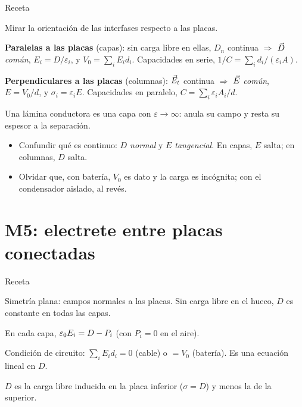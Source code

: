 \begin{metodo}{Receta}
\begin{pasos}
  \item Mirar la orientación de las interfases respecto a las placas.
  \item \textbf{Paralelas a las placas} (capas): sin carga libre en ellas, $D_n$ continua $\Rightarrow$ $\vec D$ \emph{común}, $E_i=D/\varepsilon_i$,
        y $V_0=\sum_iE_id_i$. Capacidades en serie, $1/C=\sum_i d_i/(\varepsilon_iA)$.
  \item \textbf{Perpendiculares a las placas} (columnas): $\vec E_t$ continua $\Rightarrow$ $\vec E$ \emph{común}, $E=V_0/d$, y $\sigma_i=\varepsilon_iE$.
        Capacidades en paralelo, $C=\sum_i\varepsilon_iA_i/d$.
  \item Una lámina conductora es una capa con $\varepsilon\to\infty$: anula su campo y resta su espesor a la separación.
\end{pasos}
\end{metodo}

\begin{trampa}
\begin{itemize}
  \item Confundir qué es continuo: \emph{$D$ normal} y \emph{$E$ tangencial}. En capas, $E$ salta; en columnas, $D$ salta.
  \item Olvidar que, con batería, $V_0$ es dato y la carga es incógnita; con el condensador aislado, al revés.
\end{itemize}
\end{trampa}

\section{M5: electrete entre placas conectadas}\label{gsec:m5}

\begin{metodo}{Receta}
\begin{pasos}
  \item Simetría plana: campos normales a las placas. Sin carga libre en el hueco, $D$ es constante en todas las capas.
  \item En cada capa, $\varepsilon_0 E_i=D-P_i$ (con $P_i=0$ en el aire).
  \item Condición de circuito: $\sum_iE_id_i=0$ (cable) o $=V_0$ (batería). Es una ecuación lineal en $D$.
  \item $D$ es la carga libre inducida en la placa inferior ($\sigma=D$) y menos la de la superior.
\end{pasos}
\end{metodo}

